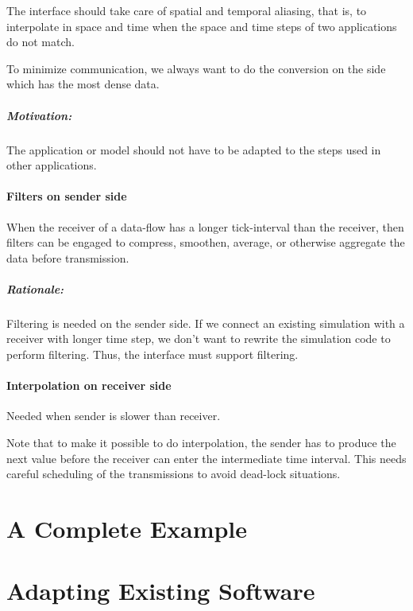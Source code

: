 \documentclass[a4paper]{report}
\newenvironment{rationale}%
{\par\paragraph{Rationale:}}%
{\par}
\begin{document}
The interface should take care of spatial and temporal aliasing, that
is, to interpolate in space and time when the space and time steps of
two applications do not match.

To minimize communication, we always want to do the conversion on the
side which has the most dense data.

\paragraph{Motivation:} The application or model should not have to be
adapted to the steps used in other applications.


\subsubsection{Filters on sender side}

When the receiver of a data-flow has a longer tick-interval than the
receiver, then filters can be engaged to compress, smoothen, average,
or otherwise aggregate the data before transmission.

\begin{rationale}
  Filtering is needed on the sender side.  If we connect an existing
  simulation with a receiver with longer time step, we don't want to
  rewrite the simulation code to perform filtering.  Thus, the
  interface must support filtering.
\end{rationale}


\subsubsection{Interpolation on receiver side}

Needed when sender is slower than receiver.

Note that to make it possible to do interpolation, the sender has to
produce the next value before the receiver can enter the intermediate
time interval.  This needs careful scheduling of the transmissions to
avoid dead-lock situations.

\chapter{A Complete Example}

\chapter{Adapting Existing Software}
\end{document}
